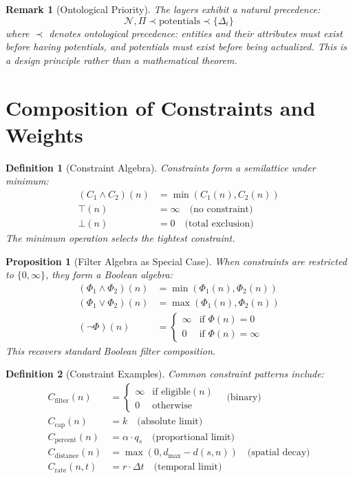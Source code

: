 \documentclass[11pt]{article}
\newtheorem{definition}{Definition}
\newtheorem{proposition}{Proposition}
\newtheorem{remark}{Remark}
\begin{document}
\begin{remark}[Ontological Priority]
The layers exhibit a natural precedence:
\[
\mathcal{N}, \Pi \prec \text{potentials} \prec \{\Delta_t\}
\]
where $\prec$ denotes ontological precedence: entities and their attributes must exist before having potentials, and potentials must exist before being actualized. This is a design principle rather than a mathematical theorem.
\end{remark}

\section{Composition of Constraints and Weights}

\begin{definition}[Constraint Algebra]
Constraints form a semilattice under minimum:
\begin{align}
(C_1 \wedge C_2)(n) &= \min(C_1(n), C_2(n)) \\
\top(n) &= \infty \quad \text{(no constraint)} \\
\bot(n) &= 0 \quad \text{(total exclusion)}
\end{align}
The minimum operation selects the tightest constraint.
\end{definition}

\begin{proposition}[Filter Algebra as Special Case]
When constraints are restricted to $\{0, \infty\}$, they form a Boolean algebra:
\begin{align}
(\Phi_1 \land \Phi_2)(n) &= \min(\Phi_1(n), \Phi_2(n)) \\
(\Phi_1 \lor \Phi_2)(n) &= \max(\Phi_1(n), \Phi_2(n)) \\
(\neg \Phi)(n) &= \begin{cases} \infty & \text{if } \Phi(n) = 0 \\ 0 & \text{if } \Phi(n) = \infty \end{cases}
\end{align}
This recovers standard Boolean filter composition.
\end{proposition}

\begin{definition}[Constraint Examples]
Common constraint patterns include:
\begin{align}
C_{\text{filter}}(n) &= \begin{cases} \infty & \text{if eligible}(n) \\ 0 & \text{otherwise} \end{cases} \quad \text{(binary)} \\
C_{\text{cap}}(n) &= k \quad \text{(absolute limit)} \\
C_{\text{percent}}(n) &= \alpha \cdot q_s \quad \text{(proportional limit)} \\
C_{\text{distance}}(n) &= \max(0, d_{\max} - d(s, n)) \quad \text{(spatial decay)} \\
C_{\text{rate}}(n, t) &= r \cdot \Delta t \quad \text{(temporal limit)}
\end{align}
\end{definition}
\end{document}
